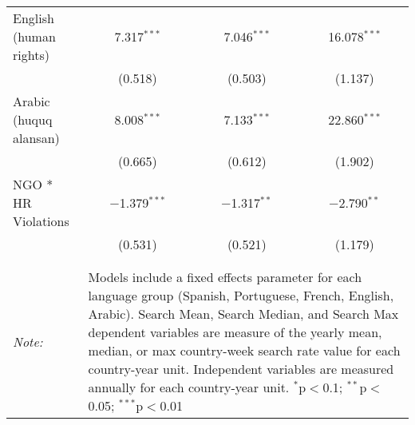 \begin{table}[!htbp]
\begin{tabular}{@{\extracolsep{5pt}}lccc}
  English (human rights) & 7.317$^{***}$ & 7.046$^{***}$ & 16.078$^{***}$ \\ 
  & (0.518) & (0.503) & (1.137) \\ 
  Arabic (huquq alansan) & 8.008$^{***}$ & 7.133$^{***}$ & 22.860$^{***}$ \\ 
  & (0.665) & (0.612) & (1.902) \\ 
  NGO * HR Violations & $-$1.379$^{***}$ & $-$1.317$^{**}$ & $-$2.790$^{**}$ \\ 
  & (0.531) & (0.521) & (1.179) \\ 
 \hline \\[-1.8ex] 
\hline 
\hline \\[-1.8ex] 
\textit{Note:}  & \multicolumn{3}{l}{\parbox[t]{8cm}{Models include a fixed effects parameter for each language group (Spanish, Portuguese, French, English, Arabic). Search Mean, Search Median, and Search Max dependent variables are measure of the yearly mean, median, or max country-week search rate value for each country-year unit. Independent variables are measured annually for each country-year unit. $^{*}$p$<$0.1; $^{**}$p$<$0.05; $^{***}$p$<$0.01}} \\ 
\end{tabular} 
\end{table} 
